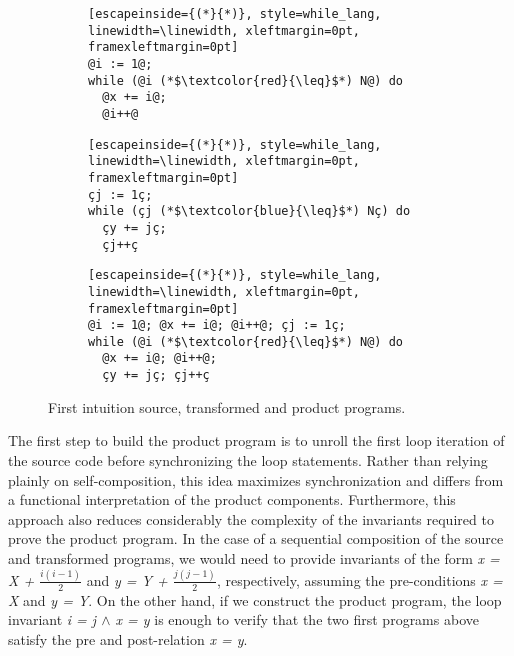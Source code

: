 \begin{figure}[h]
  \centering

  \begin{subfigure}[t]{0.28\textwidth}
    \centering
    \par\smallskip
    \noindent
    \begin{lstlisting}[escapeinside={(*}{*)}, style=while_lang, linewidth=\linewidth, xleftmargin=0pt, framexleftmargin=0pt]
@i := 1@; 
while (@i (*$\textcolor{red}{\leq}$*) N@) do
  @x += i@;
  @i++@
    \end{lstlisting}
  \end{subfigure}\hfill%
  \begin{subfigure}[t]{0.28\textwidth}
    \centering
    \par\smallskip
    \noindent
    \begin{lstlisting}[escapeinside={(*}{*)}, style=while_lang, linewidth=\linewidth, xleftmargin=0pt, framexleftmargin=0pt]
çj := 1ç; 
while (çj (*$\textcolor{blue}{\leq}$*) Nç) do
  çy += jç;
  çj++ç
    \end{lstlisting}
  \end{subfigure}\hfill%
  \begin{subfigure}[t]{0.4\textwidth}
    \centering
    \par\smallskip
    \noindent
    \begin{lstlisting}[escapeinside={(*}{*)}, style=while_lang, linewidth=\linewidth, xleftmargin=0pt, framexleftmargin=0pt]
@i := 1@; @x += i@; @i++@; çj := 1ç;
while (@i (*$\textcolor{red}{\leq}$*) N@) do
  @x += i@; @i++@;
  çy += jç; çj++ç
    \end{lstlisting}
  \end{subfigure}

  \caption{First intuition source, transformed and product programs.}
  \label{fig:pp_first_intuition}
\end{figure}

The first step to build the product program is to unroll the first loop iteration of the source code before synchronizing the loop statements.
Rather than relying plainly on self-composition, this idea maximizes synchronization and differs from a functional interpretation of the product components.
Furthermore, this approach also reduces considerably the complexity of the invariants required to prove the product program.
In the case of a sequential composition of the source and transformed programs, we would need to provide invariants of the form \emph{x = X + $\frac{i(i-1)}{2}$} and \emph{y = Y + $\frac{j(j-1)}{2}$}, respectively, assuming the pre-conditions \emph{x = X} and \emph{y = Y}.
On the other hand, if we construct the product program, the loop invariant \emph{i = j $\land$ x = y} is enough to verify that the two first programs above satisfy the pre and post-relation \emph{x = y}.


